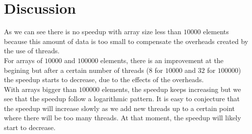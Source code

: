 \section{Discussion}

As we can see there is no speedup with array size less than $10000$ elements because this amount of data is too small to compensate the overheads created by the use of threads.\\

For arrays of $10000$ and $100000$ elements, there is an improvement at the begining but after a certain number of threads ($8$ for $10000$ and $32$ for $100000$) the speedup starts to decrease, due to the effects of the overheads.\\

With arrays bigger than $100000$ elements, the speedup keeps increasing but we see that the speedup follow a logarithmic pattern. It is easy to conjecture that the speedup will increase slowly as we add new threads up to a certain point where there will be too many threads. At that moment, the speedup will likely start to decrease.
